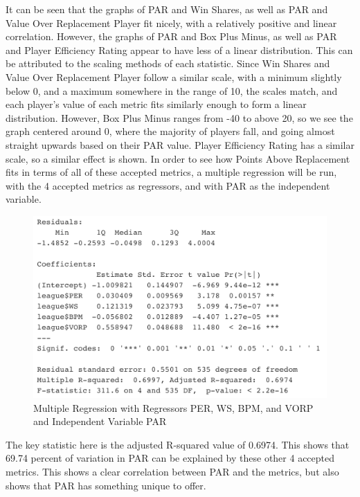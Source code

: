 \documentclass[12pt]{article}
\begin{document}
It can be seen that the graphs of PAR and Win Shares, as well as PAR and Value Over Replacement Player 
fit nicely, with a relatively positive and linear correlation. However, the graphs of PAR and Box Plus Minus, 
as well as PAR and Player Efficiency Rating appear to have less of a linear distribution. This can be 
attributed to the scaling methods of each statistic. Since Win Shares and Value Over Replacement Player 
follow a similar scale, with a minimum slightly below 0, and a maximum somewhere in the range of 10, the 
scales match, and each player's value of each metric fits similarly enough to form a linear distribution. 
However, Box Plus Minus ranges from -40 to above 20, so we see the graph centered around 0, where the 
majority of players fall, and going almost straight upwards based on their PAR value. Player Efficiency 
Rating has a similar scale, so a similar effect is shown. In order to see how Points Above Replacement fits 
in terms of all of these accepted metrics, a multiple regression will be run, with the 4 accepted metrics as 
regressors, and with PAR as the independent variable.
\begin{figure}[H]
  \centering
  \includegraphics[scale = 0.6]{MultipleRegression}
  \caption{Multiple Regression with Regressors PER, WS, BPM, and VORP and Independent Variable PAR}
  \label{fig:Fig5}
\end{figure}

The key statistic here is the adjusted R-squared value of 0.6974. This shows that 69.74 percent of variation 
in PAR can be explained by these other 4 accepted metrics. This shows a clear correlation between PAR 
and the metrics, but also shows that PAR has something unique to offer.
\end{document}
